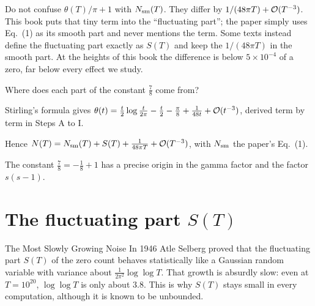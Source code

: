 \begin{pitfall}
Do not confuse $\theta(T)/\pi+1$ with $N_{\mathrm{sm}}(T)$. They differ by $1/(48\pi T)+\mathcal{O}(T^{-3})$. This book puts that tiny term into the ``fluctuating part''; the paper simply uses Eq.~(1) as its smooth part and never mentions the term. Some texts instead define the fluctuating part exactly as $S(T)$ and keep the $1/(48\pi T)$ in the smooth part. At the heights of this book the difference is below $5\times10^{-4}$ of a zero, far below every effect we study.
\end{pitfall}

\begin{checkpoint}
Where does each part of the constant $\tfrac78$ come from?
\end{checkpoint}

\begin{keyideas}
\item Stirling's formula gives $\theta(t)=\frac t2\log\frac t{2\pi}-\frac t2-\frac\pi8+\frac1{48t}+\mathcal{O}(t^{-3})$, derived term by term in Steps A to I.
\item Hence $N(T)=N_{\mathrm{sm}}(T)+S(T)+\frac{1}{48\pi T}+\mathcal{O}(T^{-3})$, with $N_{\mathrm{sm}}$ the paper's Eq.~(1).
\item The constant $\tfrac78=-\tfrac18+1$ has a precise origin in the gamma factor and the factor $s(s-1)$.
\end{keyideas}

\section{The fluctuating part $S(T)$}\label{sec:counting-zeros-S}
\begin{didyouknow}{The Most Slowly Growing Noise}
In 1946 Atle Selberg proved that the fluctuating part $S(T)$ of the zero count behaves statistically like a Gaussian random variable with variance about $\tfrac{1}{2\pi^2}\log\log T$. That growth is absurdly slow: even at $T=10^{20}$, $\log\log T$ is only about $3.8$. This is why $S(T)$ stays small in every computation, although it is known to be unbounded.
\end{didyouknow}

